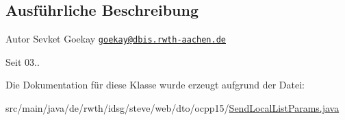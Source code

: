 \subsection{Ausführliche Beschreibung}
\begin{DoxyAuthor}{Autor}
Sevket Goekay \href{mailto:goekay@dbis.rwth-aachen.de}{\tt goekay@dbis.\+rwth-\/aachen.\+de} 
\end{DoxyAuthor}
\begin{DoxySince}{Seit}
03.. 
\end{DoxySince}


Die Dokumentation für diese Klasse wurde erzeugt aufgrund der Datei\+:\begin{DoxyCompactItemize}
\item 
src/main/java/de/rwth/idsg/steve/web/dto/ocpp15/\hyperlink{_send_local_list_params_8java}{Send\+Local\+List\+Params.\+java}\end{DoxyCompactItemize}
